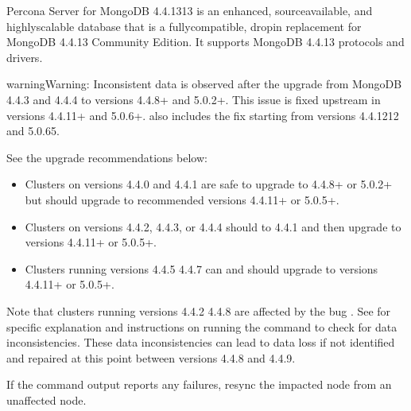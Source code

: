 \documentclass[letterpaper,10pt,english]{sphinxmanual}
\begin{document}
\sphinxAtStartPar
Percona Server for MongoDB 4.4.13\sphinxhyphen{}13 is an enhanced, source\sphinxhyphen{}available, and highly\sphinxhyphen{}scalable database that is a
fully\sphinxhyphen{}compatible, drop\sphinxhyphen{}in replacement for MongoDB 4.4.13 Community Edition.
It supports MongoDB 4.4.13 protocols and drivers.

\begin{sphinxadmonition}{warning}{Warning:}
\sphinxAtStartPar
Inconsistent data is observed after the upgrade from MongoDB 4.4.3 and 4.4.4 to versions 4.4.8+ and 5.0.2+.
This issue is fixed upstream in versions 4.4.11+ and 5.0.6+.  also includes the fix starting from versions 4.4.12\sphinxhyphen{}12 and 5.0.6\sphinxhyphen{}5.

\sphinxAtStartPar
See the upgrade recommendations below:
\begin{itemize}
\item {} 
\sphinxAtStartPar
Clusters on versions 4.4.0 and 4.4.1 are safe to upgrade to 4.4.8+ or 5.0.2+ but should upgrade to recommended versions 4.4.11+ or 5.0.5+.

\item {} 
\sphinxAtStartPar
Clusters on versions 4.4.2, 4.4.3, or 4.4.4 should  to 4.4.1 and then upgrade to versions  4.4.11+ or 5.0.5+.

\item {} 
\sphinxAtStartPar
Clusters running versions 4.4.5 \sphinxhyphen{} 4.4.7 can and should upgrade to versions 4.4.11+ or 5.0.5+.

\end{itemize}

\sphinxAtStartPar
Note that clusters running versions 4.4.2 \sphinxhyphen{} 4.4.8 are affected by the bug . See  for specific explanation and instructions on running the  command to check for data inconsistencies. These data inconsistencies can lead to data loss if not identified and repaired at this point between versions 4.4.8 and 4.4.9.

\sphinxAtStartPar
If the   command output reports any failures, resync the impacted node from an unaffected node.   
\end{sphinxadmonition}
\end{document}

